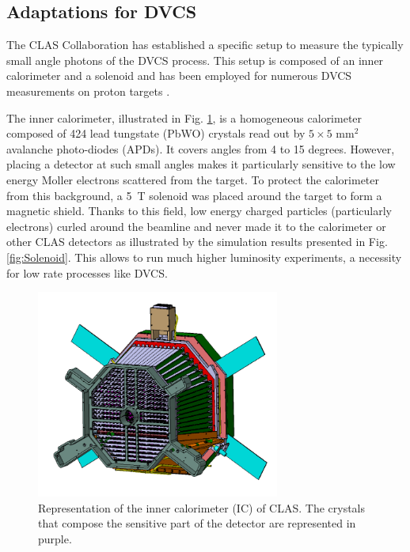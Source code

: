\documentclass[aps,prc,preprint,superscriptaddress]{revtex4}
\begin{document}
\subsection{Adaptations for DVCS}

The CLAS Collaboration has established a specific setup to measure the typically 
small angle photons of the DVCS process. This setup is composed of an inner 
calorimeter and a solenoid and has been employed for numerous DVCS measurements on proton 
targets \cite{Seder:2014cdc,Jo:2015ema,HirlingerSaylor:2018bnu}.

The inner calorimeter, illustrated in Fig. \ref{fig:IC}, is a homogeneous 
calorimeter composed of 424 lead tungstate 
(PbWO) crystals read out by $5 \times 5$ mm$^2$ avalanche photo-diodes (APDs). 
It covers angles from 4 to 15 degrees. However, placing a detector at such small angles makes it 
particularly sensitive to the low energy Moller electrons scattered from the target.
To protect the calorimeter from this background, a 5~T solenoid was 
placed around the target to form
a magnetic shield. Thanks to this field, low energy charged particles (particularly 
electrons) curled around the beamline 
and never made it to the calorimeter or other CLAS detectors as illustrated 
by the simulation results presented 
in Fig. \ref{fig:Solenoid}. This allows to run much higher luminosity experiments,
a necessity for low rate processes like DVCS.

\begin{figure}[tbp!]
\center
\includegraphics[width=8cm]{IC-CLAS.png}
	\caption{Representation of the inner calorimeter (IC) of CLAS. The crystals that compose the
	sensitive part of the detector are represented in purple.}
\label{fig:IC}
\end{figure}
\end{document}
